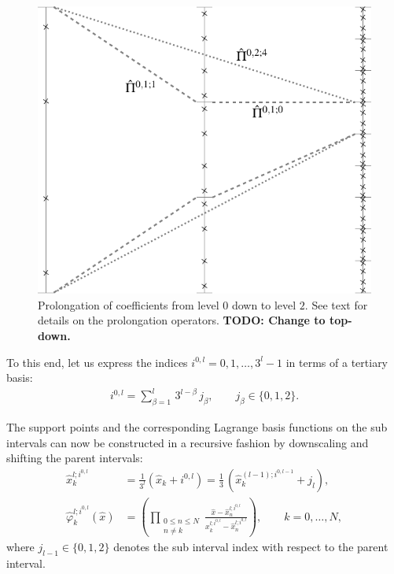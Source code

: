 \documentclass{scrreprt}
\theoremstyle{definition}
\theoremstyle{nonumberplain}
\begin{document}
\begin{figure}
\centering
\includegraphics{amr_prolongation.pdf}
\caption[AMR prolongation]{Prolongation of coefficients from level $0$
down to level $2$. See
text for details on the prolongation operators. \textbf{TODO: Change to
top-down.}}
\label{fig:amr:prolongation}
\end{figure}
To this end, let us express the indices
$i^{0,l}=0,1,\ldots,3^l-1$
in terms of a tertiary basis:
\begin{align}
\label{eq:ader_impl:amr:subinterval_index}
i^{0,l} = \sum_{\beta=1}^{l}\,3^{l-\beta}\,j_\beta,\qquad j_\beta \in \{ 0,
1, 2 \}.
\end{align}

The support points and the corresponding
Lagrange basis functions
on the sub intervals can now be constructed in a recursive fashion
by downscaling and shifting the parent intervals:
\begin{align}
\hat{x}^{l;i^{0,l}}_k &= \frac{1}{3^l} (\hat{x}_k+i^{0,l})
= \frac{1}{3}\,(\hat{x}^{(l-1);i^{0,l-1}}_k+j_{l}), \\
\hat{\varphi}^{l;i^{0,l}}_k (\hat{x}) &=
\left(\prod_{\begin{smallmatrix}0\le n\le N\\ n\neq k\end{smallmatrix}}
\frac{\hat{x}-\hat{x}^{l;i^{0,l}}_n}{x^{l;i^{0,l}}_k-\hat{x}^{l;i^{0,l}}_n}\right),
\qquad k = 0,\ldots,N,
\end{align}
where $j_{l-1}\in\{0,1,2\}$ denotes the sub
interval index with respect to the parent interval.
\end{document}
